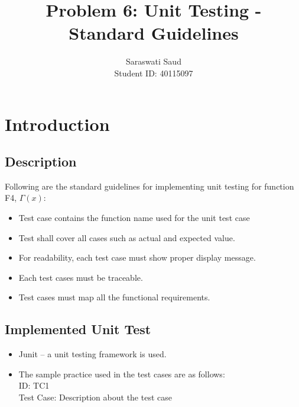 \documentclass[a4paper,12pt]{article}
\title{Problem 6: Unit Testing - Standard Guidelines}
\author{Saraswati Saud \\
Student ID: 40115097}
\date{}
\begin{document}
\maketitle
\section{Introduction}
    \subsection{Description}
    Following are the standard guidelines for implementing unit testing for function F4, $\Gamma(x)$:
    \begin{itemize}
        \item Test case contains the function name used for the unit test case
        \item Test shall cover all cases such as actual and expected value.
        \item For readability, each test case must show proper display message.
        \item Each test cases must be traceable.
        \item Test cases must map all the functional requirements.
    \end{itemize}
    
    \subsection{Implemented Unit Test}
    \begin{itemize}
        \item Junit – a unit testing framework is used.
        \item The sample practice used in the test cases are as follows: \\
            ID: TC1 \\
            Test Case: Description about the test case \\
    \end{itemize}
\end{document}
